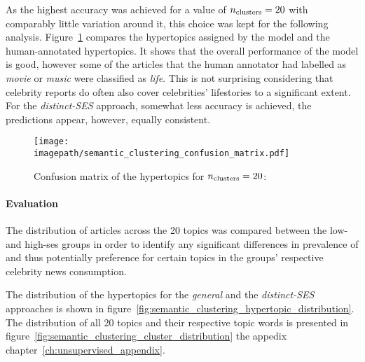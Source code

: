 As the highest accuracy was achieved for a value of $n_\text{clusters}=20$ with comparably little variation around it, this choice was kept for the following analysis. Figure~\ref{fig:embedding_confusion_matrix} compares the hypertopics assigned by the model and the human-annotated hypertopics. It shows that the overall performance of the model is good, however some of the articles that the human annotator had labelled as \textit{movie} or \textit{music} were classified as \textit{life}. This is not surprising considering that celebrity reports do often also cover celebrities' lifestories to a significant extent. For the \textit{distinct-SES} approach, somewhat less accuracy is achieved, the predictions appear, however, equally consistent.

\begin{figure}
    \centering
    \texttt{[image: \\imagepath/semantic\_clustering\_confusion\_matrix.pdf]}
    \caption{Confusion matrix of the hypertopics for $n_\text{clusters}=20$:}\label{fig:embedding_confusion_matrix}
\end{figure}

\paragraph{Evaluation}
The distribution of articles across the \SI{20}{} topics was compared between the low- and high-\gls{ses} groups in order to identify any significant differences in prevalence of and thus potentially preference for certain topics in the groups' respective celebrity news consumption.

The distribution of the hypertopics for the \textit{general} and the \textit{distinct-SES} approaches is shown in figure~\ref{fig:semantic_clustering_hypertopic_distribution}. The distribution of all \SI{20}{} topics and their respective topic words is presented in figure~\ref{fig:semantic_clustering_cluster_distribution} the appedix chapter~\ref{ch:unsupervised_appendix}.

